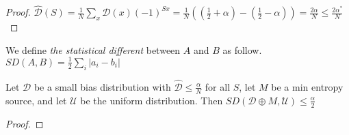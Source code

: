 \begin{proof}
$\hat{\mathcal{D}}(S) = \frac{1}{N} \sum\limits_{x} \mathcal{D}(x) (-1)^{Sx} = \frac{1}{N} ((\frac{1}{2}+ \alpha) - (\frac{1}{2} - \alpha)) = \frac{2\alpha}{N} \leq \frac{2\alpha^*}{N}$ 
\end{proof}

\begin{definition}
We define \textit{the statistical different} between $A$ and $B$ as follow. \center
$SD(A,B) = \frac{1}{2} \sum\limits_{i} |a_i - b_i |$
\end{definition}
\begin{theorem}
Let $\mathcal{D}$ be a small bias distribution with $\hat{\mathcal{D}} \leq \frac{\alpha}{N}$ for all $S$, let $M$ be a min entropy source, and let $\mathcal{U}$ be  the uniform distribution. Then $SD(\mathcal{D} \oplus M, \mathcal{U}) \leq \frac{\alpha}{2}$
\end{theorem}

\begin{proof}

\end{proof}



